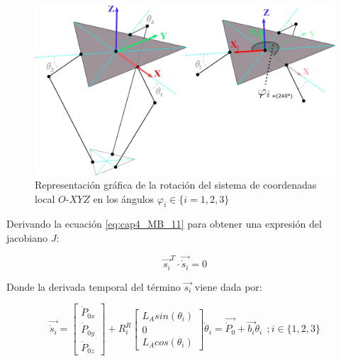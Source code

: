             \begin{figure}[htb]
                 \centering
                 \includegraphics[width=0.9\linewidth]{Main/Chapter4/Images4/DIBUJO33.jpg}
                  \caption{Representación gráfica de la rotación del sistema de coordenadas local $O$-$XYZ$ en los ángulos $\varphi_i \in \{i=1,2,3\}$ }
                  \label{f:Cap4_Metodo_B_Modelacion_Cinematica_Posicion_5asdasdfvtk}
            \end{figure}  
            
            
            
    \newpage

            
    Derivando la ecuación \ref{eq:cap4_MB_11} para obtener una expresión del jacobiano $J$: 
    
    \begin{equation} 
            \overrightarrow{s_{i}}^T \cdot \overrightarrow{\dot{s}_{i}}= 0
            \label{eq:cap4_MB_1141}
        \end{equation} 
    
    Donde la derivada temporal del término $\overrightarrow{{s}_{i}}$ viene dada por:
    
    \begin{equation}
            \overrightarrow{\dot{s}_{i}}=\begin{bmatrix}
                \dot{P}_{0x} \\
                \dot{P}_{0y} \\
                \dot{P}_{0z}
            \end{bmatrix} +  R_{i}^{R}
            \begin{bmatrix}
                L_{A} sin(\theta_i) \\
                0\\
                L_{A} cos(\theta_i) 
            \end{bmatrix} \dot{\theta}_i = \overrightarrow{\dot{P}_0}+\overrightarrow{b_i}\dot{\theta}_i ~~; i \in \{1,2,3\}
        \label{eq:cap4_MB_12112}
    \end{equation}
    
